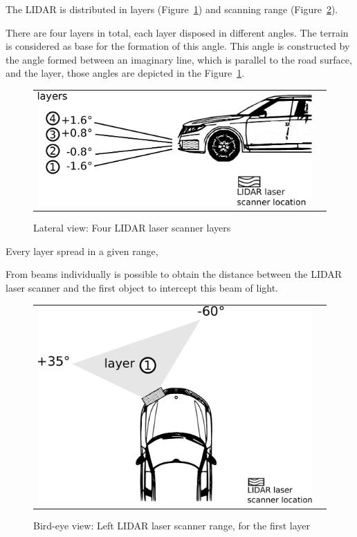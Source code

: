 The LIDAR is distributed in layers (Figure~\ref{fig:demonstrator:lateral}) and scanning range (Figure~\ref{fig:demonstrator:superior}). 

There are four layers in total, each layer disposed in different angles. The terrain is considered as base for the formation of this angle. This angle is constructed by the angle formed between an imaginary line, which is parallel to the road surface, and the layer, those angles are depicted in the Figure~\ref{fig:demonstrator:lateral}.

\begin{figure}[h]
   \centering
     \begin{tabular}{lr}
       \includegraphics[scale=0.5]{img/fig:demonstrator:lateral}
     \end{tabular}
   \caption{Lateral view: Four LIDAR laser scanner layers}
   \label{fig:demonstrator:lateral}
\end{figure}

Every layer spread in a given range, 

From beams individually is possible to obtain the distance between the LIDAR laser scanner and the first object to intercept this beam of light.

\begin{figure}[h]
   \centering
     \begin{tabular}{lr}
       \includegraphics[scale=0.5]{img/fig:demonstrator:superior}
     \end{tabular}
   \caption{Bird-eye view: Left LIDAR laser scanner range, for the first layer}
   \label{fig:demonstrator:superior}
\end{figure}


